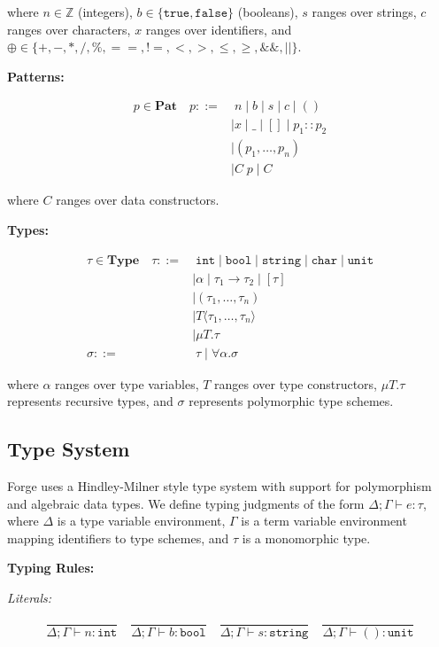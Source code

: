 \documentclass[10pt,letterpaper,twocolumn]{article}
\begin{document}
where $n \in \mathbb{Z}$ (integers), $b \in \{\texttt{true}, \texttt{false}\}$ (booleans), $s$ ranges over strings, $c$ ranges over characters, $x$ ranges over identifiers, and $\oplus \in \{+, -, *, /, \%, ==, !=, <, >, \le, \ge, \&\&, ||\}$.

\textbf{Patterns:}

\begin{align*}
p \in \textbf{Pat} \quad p ::= &\; n \mid b \mid s \mid c \mid () \\
&\mid x \mid \_ \mid [] \mid p_1 :: p_2 \\
&\mid (p_1, \ldots, p_n) \\
&\mid C\;p \mid C
\end{align*}

where $C$ ranges over data constructors.

\textbf{Types:}

\begin{align*}
\tau \in \textbf{Type} \quad \tau ::= &\; \texttt{int} \mid \texttt{bool} \mid \texttt{string} \mid \texttt{char} \mid \texttt{unit} \\
&\mid \alpha \mid \tau_1 \to \tau_2 \mid [\tau] \\
&\mid (\tau_1, \ldots, \tau_n) \\
&\mid T\langle\tau_1, \ldots, \tau_n\rangle \\
&\mid \mu T.\tau \\
\sigma ::= &\; \tau \mid \forall \alpha.\sigma
\end{align*}

where $\alpha$ ranges over type variables, $T$ ranges over type constructors, $\mu T.\tau$ represents recursive types, and $\sigma$ represents polymorphic type schemes.

\subsection{Type System}

Forge uses a Hindley-Milner style type system with support for polymorphism and algebraic data types. We define typing judgments of the form $\Delta; \Gamma \vdash e : \tau$, where $\Delta$ is a type variable environment, $\Gamma$ is a term variable environment mapping identifiers to type schemes, and $\tau$ is a monomorphic type.

\textbf{Typing Rules:}

\textit{Literals:}

$$
\frac{}{\Delta; \Gamma \vdash n : \texttt{int}}
\quad
\frac{}{\Delta; \Gamma \vdash b : \texttt{bool}}
\quad
\frac{}{\Delta; \Gamma \vdash s : \texttt{string}}
\quad
\frac{}{\Delta; \Gamma \vdash () : \texttt{unit}}
$$
\end{document}
